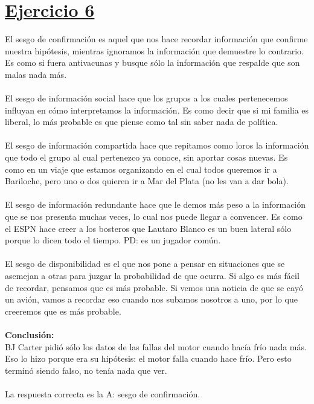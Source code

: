 \documentclass{article}
\newcommand{\ulcolor}[2][Red]{\setulcolor{#1}\ul{#2}}
\begin{document}
    \section*{\ulcolor[Green]{Ejercicio 6}}
        El sesgo de confirmación es aquel que nos hace recordar información que confirme nuestra hipótesis, mientras ignoramos la información que demuestre lo contrario. Es como si fuera antivacunas y busque sólo la información que respalde que son malas nada más. \\
        \\
        El sesgo de información social hace que los grupos a los cuales pertenecemos influyan en cómo interpretamos la información. Es como decir que si mi familia es liberal, lo más probable es que piense como tal sin saber nada de política. \\
        \\
        El sesgo de información compartida hace que repitamos como loros la información que todo el grupo al cual pertenezco ya conoce, sin aportar cosas nuevas. Es como en un viaje que estamos organizando en el cual todos queremos ir a Bariloche, pero uno o dos quieren ir a Mar del Plata (no les van a dar bola). \\
        \\
        El sesgo de información redundante hace que le demos más peso a la información que se nos presenta muchas veces, lo cual nos puede llegar a convencer. Es como el ESPN hace creer a los bosteros que Lautaro Blanco es un buen lateral sólo porque lo dicen todo el tiempo. PD: es un jugador común. \\
        \\
        El sesgo de disponibilidad es el que nos pone a pensar en situaciones que se asemejan a otras para juzgar la probabilidad de que ocurra. Si algo es más fácil de recordar, pensamos que es más probable. Si vemos una noticia de que se cayó un avión, vamos a recordar eso cuando nos subamos nosotros a uno, por lo que creeremos que es más probable. \\
        \\
        \textbf{Conclusión:} \\
        BJ Carter pidió sólo los datos de las fallas del motor cuando hacía frío nada más. Eso lo hizo porque era su hipótesis: el motor falla cuando hace frío. Pero esto terminó siendo falso, no tenía nada que ver. \\
        \\
        La respuesta correcta es la A: sesgo de confirmación.
\end{document}
